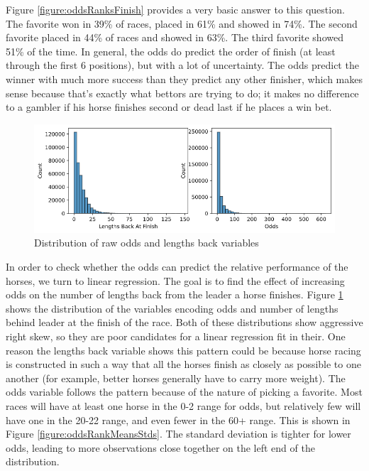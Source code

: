\documentclass{article}
\begin{document}
Figure \ref{figure:oddsRanksFinish} provides a very basic answer to this question. The favorite won in 39\% of races, placed in 61\% and showed in 74\%. The second favorite placed in 44\% of races and showed in 63\%. The third favorite showed 51\% of the time. In general, the odds do predict the order of finish (at least through the first 6 positions), but with a lot of uncertainty. The odds predict the winner with much more success than they predict any other finisher, which makes sense because that's exactly what bettors are trying to do; it makes no difference to a gambler if his horse finishes second or dead last if he places a win bet.

\begin{figure}
    \centering
    \includegraphics[width=12cm]{images/lengths_odds_no_trans_chart.png}

    \caption{Distribution of raw odds and lengths back variables} 
    \label{figure:oddsLengthsNoTrans} 
\end{figure}

In order to check whether the odds can predict the relative performance of the horses, we turn to linear regression. The goal is to find the effect of increasing odds on the number of lengths back from the leader a horse finishes. Figure \ref{figure:oddsLengthsNoTrans} shows the distribution of the variables encoding odds and number of lengths behind leader at the finish of the race. Both of these distributions show aggressive right skew, so they are poor candidates for a linear regression fit in their. One reason the lengths back variable shows this pattern could be because horse racing is constructed in such a way that all the horses finish as closely as possible to one another (for example, better horses generally have to carry more weight). The odds variable follows the pattern because of the nature of picking a favorite. Most races will have at least one horse in the 0-2 range for odds, but relatively few will have one in the 20-22 range, and even fewer in the 60+ range. This is shown in Figure \ref{figure:oddsRankMeansStds}. The standard deviation is tighter for lower odds, leading to more observations close together on the left end of the distribution.
\end{document}
